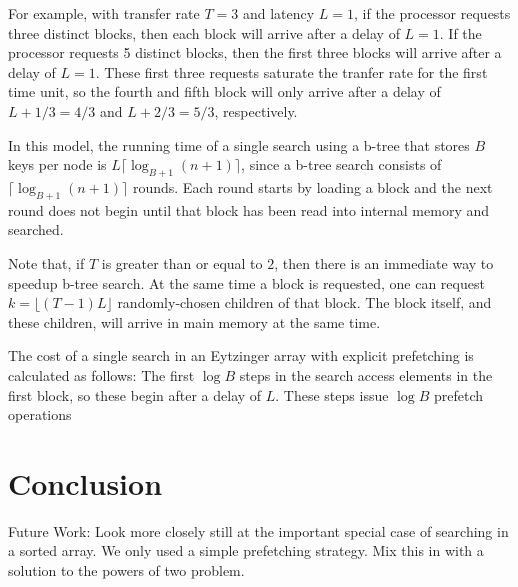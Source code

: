 \documentclass{patmorin}
\begin{document}
For example, with transfer rate $T=3$ and latency $L=1$, if the processor
requests three distinct blocks, then each block will arrive after a
delay of $L=1$.  If the processor requests 5 distinct blocks, then
the first three blocks will arrive after a delay of $L=1$. These first
three requests saturate the tranfer rate for the first time unit, so
the fourth and fifth block will only arrive after a delay of $L+1/3=4/3$
and $L+2/3=5/3$, respectively.

In this model, the running time of a single search using a b-tree that
stores $B$ keys per node is $L\lceil\log_{B+1}(n+1)\rceil$, since a
b-tree search consists of $\lceil\log_{B+1}(n+1)\rceil$ rounds. Each
round starts by loading a block and the next round does not begin until
that block has been read into internal memory and searched.

Note that, if $T$ is greater than or equal to $2$, then there is an
immediate way to speedup b-tree search. At the same time a block is
requested, one can request $k=\lfloor (T-1)L\rfloor$ randomly-chosen
children of that block.  The block itself, and these children, will
arrive in main memory at the same time.  

The cost of a single search in an Eytzinger array with explicit
prefetching is calculated as follows:  The first $\log B$ steps in the
search access elements in the first block, so these begin after a delay
of $L$. These steps issue $\log B$ prefetch operations

\section{Conclusion}

Future Work: Look more closely still at the important special case of searching
in a sorted array. We only used a simple prefetching strategy. Mix this
in with a solution to the powers of two problem.
\end{document}

